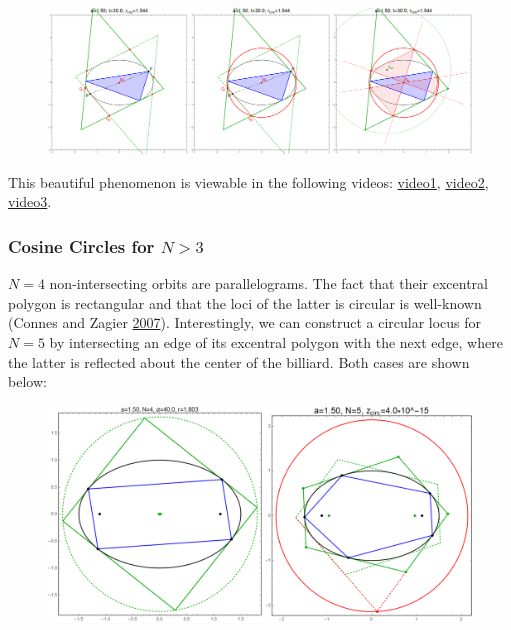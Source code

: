 \documentclass[]{article}
\begin{document}
\begin{figure}[H]

{\centering \includegraphics[width=1\linewidth]{pics/cosine_circle_excentral_and_hex} 

}

\end{figure}

This beautiful phenomenon is viewable in the following videos: \href{https://youtu.be/hCQIT6_XhaQ}{video1}, \href{https://youtu.be/CrOSI8d8qDc}{video2}, \href{https://youtu.be/ACinCf-D_Ok}{video3}.

\hypertarget{cosine-circles-for-n3}{%
\subsubsection{\texorpdfstring{Cosine Circles for \(N>3\)}{Cosine Circles for N\textgreater{}3}}\label{cosine-circles-for-n3}}

\(N=4\) non-intersecting orbits are parallelograms. The fact that their excentral polygon is rectangular and that the loci of the latter is circular is well-known (Connes and Zagier \protect\hyperlink{ref-connes07}{2007}). Interestingly, we can construct a circular locus for \(N=5\) by intersecting an edge of its excentral polygon with the next edge, where the latter is reflected about the center of the billiard. Both cases are shown below:

\begin{figure}[H]

{\centering \includegraphics[width=0.75\linewidth]{pics/excentral_circular_locus_n4_n5} 

}

\end{figure}
\end{document}

